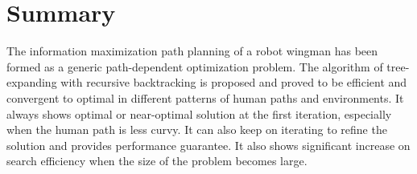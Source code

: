 \documentclass[12pt]{article}
\begin{document}
\section{Summary}

The information maximization path planning of a robot wingman has been formed as a generic path-dependent optimization problem. The algorithm of tree-expanding with recursive backtracking is proposed and proved to be efficient and convergent to optimal in different patterns of human paths and environments. It always shows optimal or near-optimal solution at the first iteration, especially when the human path is less curvy. It can also keep on iterating to refine the solution and provides performance guarantee. It also shows significant increase on search efficiency when the size of the problem becomes large.  




\end{document}
